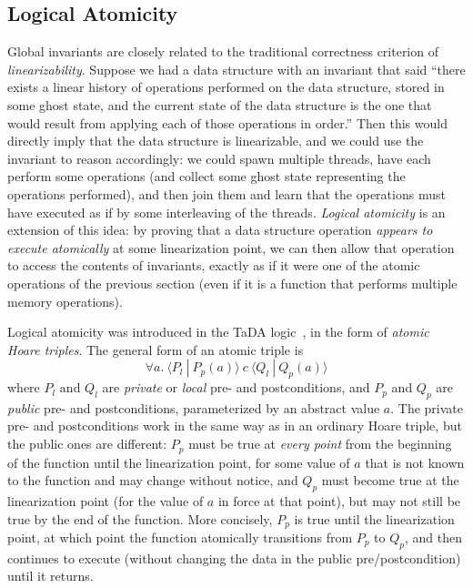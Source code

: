 \documentclass[11pt]{article}
\begin{document}
\subsection{Logical Atomicity}
Global invariants are closely related to the traditional correctness criterion of \emph{linearizability}. Suppose we had a data structure with an invariant that said ``there exists a linear history of operations performed on the data structure, stored in some ghost state, and the current state of the data structure is the one that would result from applying each of those operations in order.'' Then this would directly imply that the data structure is linearizable, and we could use the invariant to reason accordingly: we could spawn multiple threads, have each perform some operations (and collect some ghost state representing the operations performed), and then join them and learn that the operations must have executed as if by some interleaving of the threads. \emph{Logical atomicity} is an extension of this idea: by proving that a data structure operation \emph{appears to execute atomically} at some linearization point, we can then allow that operation to access the contents of invariants, exactly as if it were one of the atomic operations of the previous section (even if it is a function that performs multiple memory operations).

Logical atomicity was introduced in the TaDA logic~\cite{tada}, in the form of \emph{atomic Hoare triples}. The general form of an atomic triple is $$\forall a.\ \langle P_l\ |\ P_p(a)\rangle\ c\ \langle Q_l\ |\ Q_p(a)\rangle$$
where $P_l$ and $Q_l$ are \emph{private} or \emph{local} pre- and postconditions, and $P_p$ and $Q_p$ are \emph{public} pre- and postconditions, parameterized by an abstract value $a$. The private pre- and postconditions work in the same way as in an ordinary Hoare triple, but the public ones are different: $P_p$ must be true at \emph{every point} from the beginning of the function until the linearization point, for some value of $a$ that is not known to the function and may change without notice, and $Q_p$ must become true at the linearization point (for the value of $a$ in force at that point), but may not still be true by the end of the function. More concisely, $P_p$ is true until the linearization point, at which point the function atomically transitions from $P_p$ to $Q_p$, and then continues to execute (without changing the data in the public pre/postcondition) until it returns.
\end{document}
